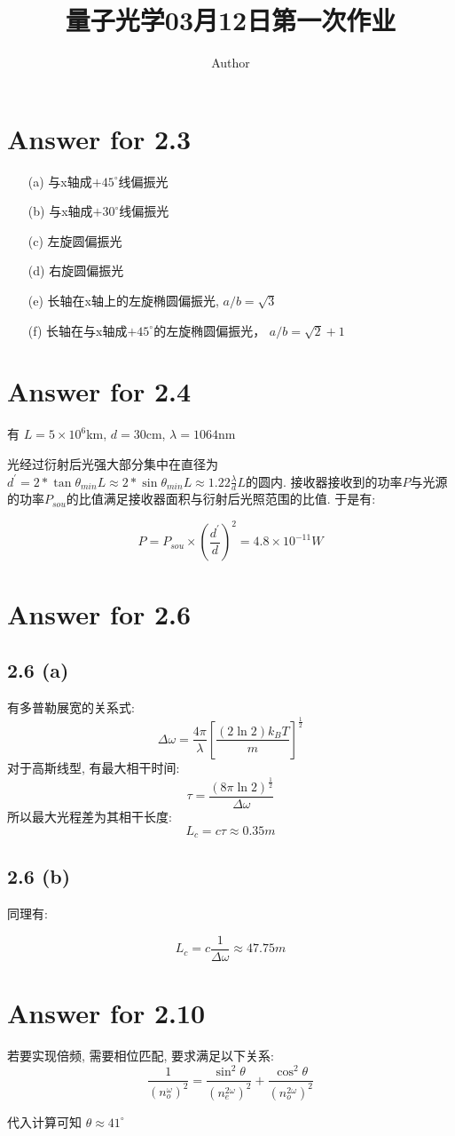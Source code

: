 \documentclass[twoside]{article}
\begin{document}
\title{量子光学03月12日第一次作业}
\author{Author}
\pagestyle{fancy}
\makeatletter
\fancyhead[L]{\@title}
\fancyhead[R]{\@author}
\makeatother
\setlength{\parindent}{0pt}

\section*{Answer for 2.3}

\begin{enumerate}
    \item[(a)] 与x轴成$+45^\circ$线偏振光
    \item[(b)] 与x轴成$+30^\circ$线偏振光
    \item[(c)] 左旋圆偏振光
    \item[(d)] 右旋圆偏振光
    \item[(e)] 长轴在x轴上的左旋椭圆偏振光, $a/b = \sqrt{3}$
    \item[(f)] 长轴在与x轴成$+45^\circ$的左旋椭圆偏振光， $a/b = \sqrt{2} + 1$
\end{enumerate}

\section*{Answer for 2.4}

有 $L = 5 \times 10^6 $km, $d = 30$cm, $ \lambda = 1064$nm

光经过衍射后光强大部分集中在直径为$d^\prime = 2 * \tan\theta_{min} L \approx 2 * \sin\theta_{min} L \approx 1.22 \frac{\lambda}{d} L$的圆内.
接收器接收到的功率$P$与光源的功率$P_{sou}$的比值满足接收器面积与衍射后光照范围的比值. 于是有:

$$
    P = P_{sou} \times \left(\frac{d^\prime}{d}\right)^2 = 4.8 \times 10^{-11} W
$$
\section*{Answer for 2.6}

\subsection*{2.6 (a)}


有多普勒展宽的关系式:
$$
    \Delta \omega = \frac{4\pi}{\lambda}\left[\frac{\left(2 \ln 2\right) k_B T}{m}\right]^{\frac{1}{2}}
$$
对于高斯线型, 有最大相干时间:
$$
    \tau = \frac{\left(8\pi\ln 2\right)^\frac{1}{2}}{\Delta \omega}
$$
所以最大光程差为其相干长度:
$$L_c = c \tau \approx 0.35 m$$

\subsection*{2.6 (b)}

同理有:

$$L_c = c \frac{1}{\Delta \omega} \approx 47.75 m $$

\section*{Answer for 2.10}

若要实现倍频, 需要相位匹配, 要求满足以下关系:
$$
    \frac{1}{\left(n^\omega_o\right)^2} = \frac{\sin^2 \theta}{\left(n^{2\omega}_e\right)^2} + \frac{\cos^2 \theta}{\left(n^{2\omega}_o\right)^2}
$$

代入计算可知 $\theta \approx 41^\circ$
\end{document}

